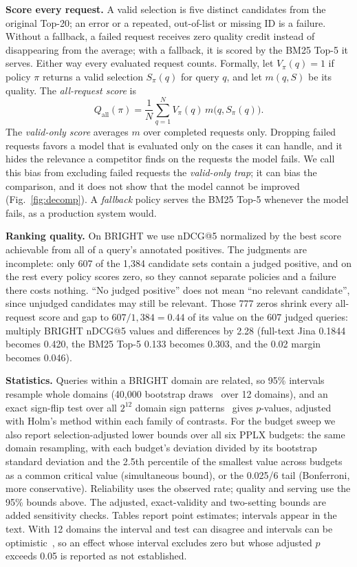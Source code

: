 \documentclass[conference]{IEEEtran}
\newcommand{\Qop}{Q_{\mathrm{all}}}
\begin{document}
{\textbf{Score every request.} A valid selection is five distinct candidates from the original Top-20; an error or a repeated, out-of-list or missing ID is a failure. Without a fallback, a failed request receives zero quality credit instead of disappearing from the average; with a fallback, it is scored by the BM25 Top-5 it serves. Either way every evaluated request counts. Formally, let $V_\pi(q)=1$ if policy $\pi$ returns a valid selection $S_\pi(q)$ for query $q$, and let $m(q,S)$ be its quality. The \emph{all-request score} is
\begin{equation}\label{eq:oper}
\Qop(\pi)=\frac{1}{N}\sum_{q=1}^N V_{\pi}(q)\,m\big(q,S_{\pi}(q)\big).
\end{equation}
The \emph{valid-only score} averages $m$ over completed requests only. Dropping failed requests favors a model that is evaluated only on the cases it can handle, and it hides the relevance a competitor finds on the requests the model fails. We call this bias from excluding failed requests the \emph{valid-only trap}; it can bias the comparison, and it does not show that the model cannot be improved (Fig.~\ref{fig:decomp}). A \emph{fallback} policy serves the BM25 Top-5 whenever the model fails, as a production system would.

\textbf{Ranking quality.} On BRIGHT we use nDCG@5 normalized by the best score achievable from all of a query's annotated positives. The judgments are incomplete: only 607 of the 1,384 candidate sets contain a judged positive, and on the rest every policy scores zero, so they cannot separate policies and a failure there costs nothing. ``No judged positive'' does not mean ``no relevant candidate'', since unjudged candidates may still be relevant. Those 777 zeros shrink every all-request score and gap to $607/1{,}384=0.44$ of its value on the 607 judged queries: multiply BRIGHT nDCG@5 values and differences by 2.28 (full-text Jina 0.1844 becomes 0.420, the BM25 Top-5 0.133 becomes 0.303, and the 0.02 margin becomes 0.046).

\textbf{Statistics.} Queries within a BRIGHT domain are related, so 95\% intervals resample whole domains (40,000 bootstrap draws~\cite{efron1993bootstrap} over 12 domains), and an exact sign-flip test over all $2^{12}$ domain sign patterns~\cite{smucker2007significance} gives $p$-values, adjusted with Holm's method within each family of contrasts. For the budget sweep we also report selection-adjusted lower bounds over all six PPLX budgets: the same domain resampling, with each budget's deviation divided by its bootstrap standard deviation and the 2.5th percentile of the smallest value across budgets as a common critical value (simultaneous bound), or the 0.025/6 tail (Bonferroni, more conservative). Reliability uses the observed rate; quality and serving use the 95\% bounds above. The adjusted, exact-validity and two-setting bounds are added sensitivity checks. Tables report point estimates; intervals appear in the text. With 12 domains the interval and test can disagree and intervals can be optimistic~\cite{cameron2008cluster}, so an effect whose interval excludes zero but whose adjusted $p$ exceeds 0.05 is reported as not established.

}
\end{document}
